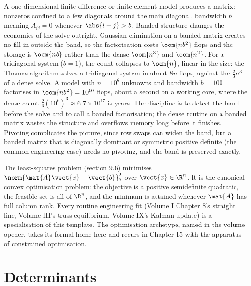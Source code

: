 \begin{example}
A one-dimensional finite-difference or finite-element model produces a
 matrix: nonzeros confined to a few diagonals around
the main diagonal, bandwidth $b$ meaning $A_{ij} = 0$ whenever
$\abs{i - j} > b$. Banded structure changes the economics of the
solve outright. Gaussian elimination on a banded matrix creates no
fill-in outside the band, so the factorisation costs $\oom{n b^{2}}$
flops and the storage is $\oom{n b}$ rather than the dense $\oom{n^{3}}$
and $\oom{n^{2}}$. For a tridiagonal system ($b = 1$), the count
collapses to $\oom{n}$, linear in the size: the Thomas algorithm
solves a tridiagonal system in about $8n$ flops, against the
$\tfrac{2}{3}n^{3}$ of a dense solve. A model with $n = 10^{6}$
unknowns and bandwidth $b = 100$ factorises in $\oom{n b^{2}} =
10^{10}$ flops, about a second on a working core, where the dense
count $\tfrac{2}{3}(10^{6})^{3} \approx 6.7 \times 10^{17}$ is years.
The discipline is to detect the band before the solve and to call a
banded factorisation; the dense routine on a banded matrix wastes the
structure and overflows memory long before it finishes. Pivoting
complicates the picture, since row swaps can widen the band, but a
banded matrix that is diagonally dominant or symmetric positive
definite (the common engineering case) needs no pivoting, and the
band is preserved exactly.
\end{example}

\begin{archetype}[Optimisation]
The least-squares problem (section 9.6) minimises $\norm{\mat{A}
\vect{x} - \vect{b}}_{2}^{2}$ over $\vect{x} \in \R^{n}$. It is the
canonical convex optimisation problem: the objective is a positive
semidefinite quadratic, the feasible set is all of $\R^{n}$, and
the minimum is attained whenever $\mat{A}$ has full column rank.
Every routine engineering fit (Volume I Chapter 8's straight line,
Volume III's truss equilibrium, Volume IX's Kalman update) is a
specialisation of this template. The optimisation archetype, named
in the volume opener, takes its formal home here and recurs in
Chapter 15 with the apparatus of constrained optimisation.
\end{archetype}

\section{Determinants}

